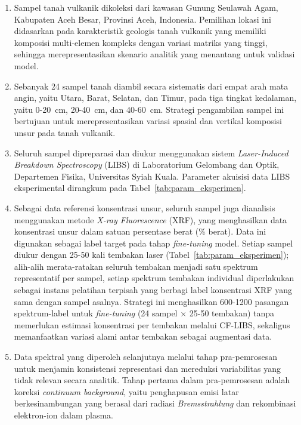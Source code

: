 \begin{enumerate}
    \item Sampel tanah vulkanik dikoleksi dari kawasan Gunung Seulawah Agam, Kabupaten Aceh Besar, Provinsi Aceh, Indonesia. Pemilihan lokasi ini didasarkan pada karakteristik geologis tanah vulkanik yang memiliki komposisi multi-elemen kompleks dengan variasi matriks yang tinggi, sehingga merepresentasikan skenario analitik yang menantang untuk validasi model.

    \item Sebanyak 24 sampel tanah diambil secara sistematis dari empat arah mata angin, yaitu Utara, Barat, Selatan, dan Timur, pada tiga tingkat kedalaman, yaitu 0-20~cm, 20-40~cm, dan 40-60~cm. Strategi pengambilan sampel ini bertujuan untuk merepresentasikan variasi spasial dan vertikal komposisi unsur pada tanah vulkanik.

    \item Seluruh sampel dipreparasi dan diukur menggunakan sistem \textit{Laser-Induced Breakdown Spectroscopy} (LIBS) di Laboratorium Gelombang dan Optik, Departemen Fisika, Universitas Syiah Kuala. Parameter akuisisi data LIBS eksperimental dirangkum pada Tabel~\ref{tab:param_eksperimen}.

    \item Sebagai data referensi konsentrasi unsur, seluruh sampel juga dianalisis menggunakan metode \textit{X-ray Fluorescence} (XRF), yang menghasilkan data konsentrasi unsur dalam satuan persentase berat (\% berat). Data ini digunakan sebagai label target pada tahap \textit{fine-tuning} model. Setiap sampel diukur dengan 25-50 kali tembakan laser (Tabel~\ref{tab:param_eksperimen}); alih-alih merata-ratakan seluruh tembakan menjadi satu spektrum representatif per sampel, setiap spektrum tembakan individual diperlakukan sebagai instans pelatihan terpisah yang berbagi label konsentrasi XRF yang sama dengan sampel asalnya. Strategi ini menghasilkan 600-1200 pasangan spektrum-label untuk \textit{fine-tuning} (24 sampel $\times$ 25-50 tembakan) tanpa memerlukan estimasi konsentrasi per tembakan melalui CF-LIBS, sekaligus memanfaatkan variasi alami antar tembakan sebagai augmentasi data.

    \item Data spektral yang diperoleh selanjutnya melalui tahap pra-pemrosesan untuk menjamin konsistensi representasi dan mereduksi variabilitas yang tidak relevan secara analitik. Tahap pertama dalam pra-pemrosesan adalah koreksi \textit{continuum background}, yaitu penghapusan emisi latar berkesinambungan yang berasal dari radiasi \textit{Bremsstrahlung} dan rekombinasi elektron-ion dalam plasma.


\end{enumerate}
